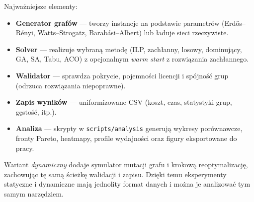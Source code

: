 Najważniejsze elementy:
\begin{itemize}
  \item \textbf{Generator grafów} — tworzy instancje na podstawie parametrów (Erdős–Rényi, Watts–Strogatz, Barabási–Albert) lub ładuje sieci rzeczywiste.
  \item \textbf{Solver} — realizuje wybraną metodę (ILP, zachłanny, losowy, dominujący, GA, SA, Tabu, ACO) z opcjonalnym \emph{warm start} z rozwiązania zachłannego.
  \item \textbf{Walidator} — sprawdza pokrycie, pojemności licencji i spójność grup (odrzuca rozwiązania niepoprawne).
  \item \textbf{Zapis wyników} — uniformizowane CSV (koszt, czas, statystyki grup, gęstość, itp.).
  \item \textbf{Analiza} — skrypty w \texttt{scripts/analysis} generują wykresy porównawcze, fronty Pareto, heatmapy, profile wydajności oraz figury eksportowane do pracy.
\end{itemize}

Wariant \emph{dynamiczny} dodaje symulator mutacji grafu i krokową reoptymalizację, zachowując tę samą ścieżkę walidacji i zapisu. Dzięki temu eksperymenty statyczne i dynamiczne mają jednolity format danych i można je analizować tym samym narzędziem.
